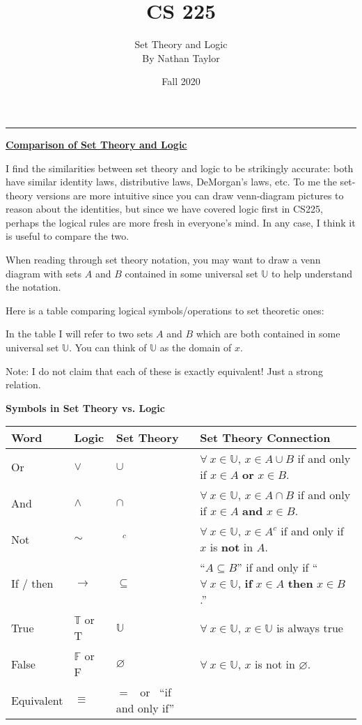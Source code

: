 \documentclass[11pt]{article}
\title{CS 225}
\author{{\Large Set Theory and Logic} \\ {\small By Nathan Taylor}}
\date{Fall 2020}
\begin{document}
\maketitle
\hrule

\begin{center}\underline{\bf \huge Comparison of Set Theory and Logic}\end{center}
\bigskip

I find the similarities between set theory and logic to be strikingly accurate:
both have similar identity laws, distributive laws, DeMorgan's laws, etc. 
To me the set-theory versions are more intuitive since you can draw venn-diagram
pictures to reason about the identities, but since we have covered logic first in 
CS225, perhaps the logical rules are more fresh in everyone's mind. In any case, 
I think it is useful to compare the two. 

\bigskip 
When reading through set theory notation, you may want to draw a venn diagram with 
sets $A$ and $B$ contained in some universal set $\mathbb{U}$ to help understand the 
notation. 

\bigskip
Here is a table comparing logical symbols/operations to set theoretic ones:

In the table I will refer to two sets $A$ and $B$ which are both contained 
in some universal set $\mathbb{U}$. You can think of $\mathbb{U}$ as the 
domain of $x$. 

Note: I do not claim that each of these is exactly equivalent! Just a strong 
relation. 

\begin{center}
    {\bf Symbols in Set Theory vs. Logic}

\begin{tabular}{l|l|l|l}
\toprule
Word & Logic & Set Theory & Set Theory Connection  \\
\midrule
Or   &     $\vee$   &         $\cup$    &  $\forall \ x \in \mathbb{U}$, $x \in A\cup B$ if and only if $x \in A$ {\bf or} $x\in B$. \\
And  &     $\wedge$ &         $\cap$    &  $\forall \ x \in \mathbb{U}$, $x \in A \cap B$ if and only if $x \in A$ {\bf and} $x \in B$. \\
Not  &     $\sim$   &   $\phantom{h}^c$ & $\forall \ x \in \mathbb{U}$, $x\in A^c$ if and only if $x$ is {\bf not} in $A$. \\
If / then & $\to$   &  $\subseteq$      & ``$A \subseteq B$'' if and only if ``$\forall \ x \in \mathbb{U}$, {\bf if} $x\in A$ {\bf then} $x\in B$.'' \\
True & $\mathbb{T}$ or T & $\mathbb{U}$ & $\forall \ x\in \mathbb{U}$, $x \in \mathbb{U}$ is always true\\
False & $\mathbb{F}$ or F & $\varnothing$ & $\forall \ x\in \mathbb{U}$, $x$ is not in $\varnothing$. \\
Equivalent & $\equiv$ &  $=$ \ or \   ``if and only if''    \\
\bottomrule
\end{tabular}
\end{center}
\end{document}
